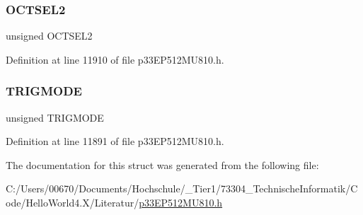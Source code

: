 \subsubsection{\texorpdfstring{O\+C\+T\+S\+E\+L2}{OCTSEL2}}
{\footnotesize\ttfamily unsigned O\+C\+T\+S\+E\+L2}



Definition at line 11910 of file p33\+E\+P512\+M\+U810.\+h.

\mbox{\label{structtag_o_c12_c_o_n1_b_i_t_s_a7a0057e0dca6e2663584b5b9e1da04c3}} 
\subsubsection{\texorpdfstring{T\+R\+I\+G\+M\+O\+DE}{TRIGMODE}}
{\footnotesize\ttfamily unsigned T\+R\+I\+G\+M\+O\+DE}



Definition at line 11891 of file p33\+E\+P512\+M\+U810.\+h.



The documentation for this struct was generated from the following file\+:\begin{DoxyCompactItemize}
\item 
C\+:/\+Users/00670/\+Documents/\+Hochschule/\+\_\+\+Tier1/73304\+\_\+\+Technische\+Informatik/\+Code/\+Hello\+World4.\+X/\+Literatur/\hyperlink{p33_e_p512_m_u810_8h}{p33\+E\+P512\+M\+U810.\+h}\end{DoxyCompactItemize}
